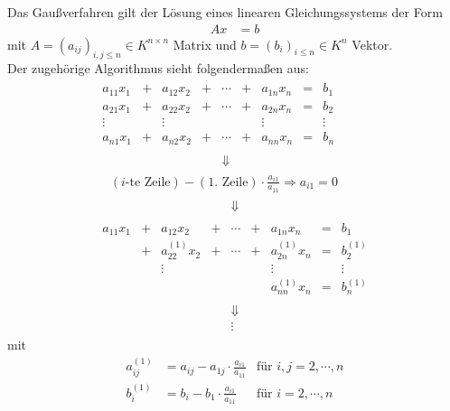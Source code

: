  \label{2.1.1}
Das Gaußverfahren gilt der Lösung eines linearen Gleichungssystems der Form
\begin{align*}
  Ax &= b
\end{align*}
mit $A=(a_{ij})_{i,j \leq n} \in K^{n\times n}$ Matrix und $b=(b_i)_{i\leq n} \in K^n$ Vektor.\\
Der zugehörige Algorithmus sieht folgendermaßen aus:
\begin{gather*}
  \begin{array}{ccccccccc}
    a_{11}x_1 &+& a_{12}x_2 &+& \cdots &+& a_{1n}x_n & = & b_1 ~~\\
    a_{21}x_1 &+& a_{22}x_2 &+& \cdots &+& a_{2n}x_n & = & b_2 \\
    \vdots         &&        \vdots     &&              &&   \vdots       &    & \vdots \\
    a_{n1}x_1 &+& a_{n2}x_2 &+& \cdots &+& a_{nn}x_n & = & b_n \\\\
              &&&& \Downarrow &&&& 
  \end{array} \\
  \quad	(\text{$i$-te Zeile}) - (\text{1. Zeile})\cdot \frac{a_{i1}}{a_{11}} \Rightarrow a_{i1}=0\\
  \begin{array}{ccccccccc}
    &&&& \Downarrow &&&&  \\\\
    a_{11}x_1 &+& a_{12}x_2 &+& \cdots &+& a_{1n}x_n & = & b_1 \\
    &+& a_{22}^{(1)}x_2 &+& \cdots &+& a_{2n}^{(1)}x_n & = & b_2^{(1)} \\
    &&        \vdots     &&              &&   \vdots       &    & \vdots \\
    && && && a_{nn}^{(1)}x_n & = & b_n^{(1)} \\\\
    &&&& \Downarrow &&&&\\
    &&&& \vdots &&&&
  \end{array} 
\end{gather*}
mit
\begin{align*}
  a_{ij}^{(1)} &= a_{ij}-a_{1j}\cdot \frac{a_{i1}}{a_{11}}
  & \text{für }i,j = 2, \cdots, n \\
  b_i^{(1)}      &= b_i- b_1\cdot \frac{a_{i1}}{a_{11}}
  & \text{für }i = 2, \cdots, n 
\end{align*}


